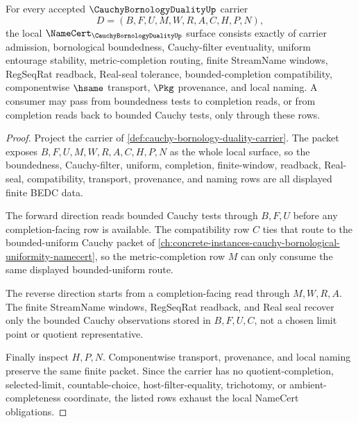 \begin{theorem}
\label{thm:cauchy-bornology-duality-namecert-obligations}
For every accepted $\CauchyBornologyDualityUp$ carrier
$$
D=(B,F,U,M,W,R,A,C,H,P,N),
$$
the local $\NameCert_{\CauchyBornologyDualityUp}$ surface consists exactly of carrier admission, bornological boundedness, Cauchy-filter eventuality, uniform entourage stability, metric-completion routing, finite StreamName windows, RegSeqRat readback, Real-seal tolerance, bounded-completion compatibility, componentwise $\hsame$ transport, $\Pkg$ provenance, and local naming. A consumer may pass from boundedness tests to completion reads, or from completion reads back to bounded Cauchy tests, only through these rows.
\end{theorem}
\begin{proof}
Project the carrier of \autoref{def:cauchy-bornology-duality-carrier}. The packet exposes $B,F,U,M,W,R,A,C,H,P,N$ as the whole local surface, so the boundedness, Cauchy-filter, uniform, completion, finite-window, readback, Real-seal, compatibility, transport, provenance, and naming rows are all displayed finite BEDC data.

The forward direction reads bounded Cauchy tests through $B,F,U$ before any completion-facing row is available. The compatibility row $C$ ties that route to the bounded-uniform Cauchy packet of \autoref{ch:concrete-instances-cauchy-bornological-uniformity-namecert}, so the metric-completion row $M$ can only consume the same displayed bounded-uniform route.

The reverse direction starts from a completion-facing read through $M,W,R,A$. The finite StreamName windows, RegSeqRat readback, and Real seal recover only the bounded Cauchy observations stored in $B,F,U,C$, not a chosen limit point or quotient representative.

Finally inspect $H,P,N$. Componentwise transport, provenance, and local naming preserve the same finite packet. Since the carrier has no quotient-completion, selected-limit, countable-choice, host-filter-equality, trichotomy, or ambient-completeness coordinate, the listed rows exhaust the local NameCert obligations.
\end{proof}

